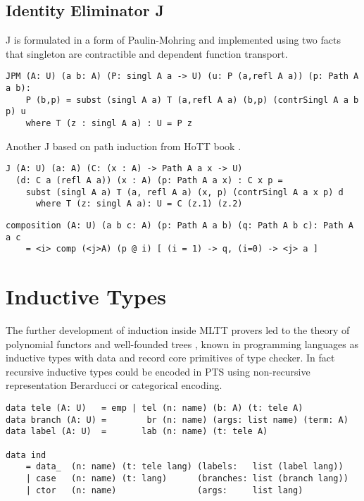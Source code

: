 \documentclass{article}
\begin{document}
\subsection*{Identity Eliminator J}

J is formulated in a form of Paulin-Mohring and implemented
using two facts that singleton are contractible and dependent function transport.

\begin{lstlisting}[mathescape=true]
JPM (A: U) (a b: A) (P: singl A a -> U) (u: P (a,refl A a)) (p: Path A a b):
    P (b,p) = subst (singl A a) T (a,refl A a) (b,p) (contrSingl A a b p) u
    where T (z : singl A a) : U = P z
\end{lstlisting}

Another J based on path induction from HoTT book \cite{HoTT13}.

\begin{lstlisting}[mathescape=true]
J (A: U) (a: A) (C: (x : A) -> Path A a x -> U)
  (d: C a (refl A a)) (x : A) (p: Path A a x) : C x p =
    subst (singl A a) T (a, refl A a) (x, p) (contrSingl A a x p) d
      where T (z: singl A a): U = C (z.1) (z.2)
\end{lstlisting}

\begin{lstlisting}[mathescape=true]
composition (A: U) (a b c: A) (p: Path A a b) (q: Path A b c): Path A a c
    = <i> comp (<j>A) (p @ i) [ (i = 1) -> q, (i=0) -> <j> a ]
\end{lstlisting}

\section{Inductive Types}

The further development of induction \cite{Dybjer94,Vene00} inside MLTT provers led
to the theory of polynomial functors and well-founded trees \cite{Gambino03},
known in programming languages as inductive types with data
and record core primitives of type checker. In fact recursive inductive
types \cite{Wadler90} could be encoded in PTS using non-recursive representation
Berarducci \cite {Bohm85} or categorical encoding.

\begin{lstlisting}[mathescape=true]
data tele (A: U)   = emp | tel (n: name) (b: A) (t: tele A)
data branch (A: U) =        br (n: name) (args: list name) (term: A)
data label (A: U)  =       lab (n: name) (t: tele A)

data ind
    = data_  (n: name) (t: tele lang) (labels:   list (label lang))
    | case   (n: name) (t: lang)      (branches: list (branch lang))
    | ctor   (n: name)                (args:     list lang)
\end{lstlisting}
\end{document}
